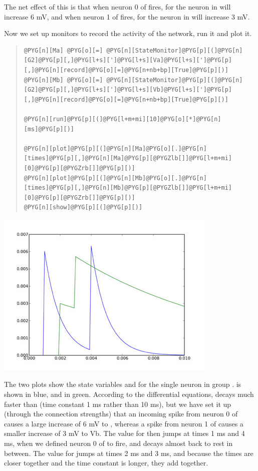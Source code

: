 \documentclass[letterpaper,10pt,english]{manual}
\begin{document}
The net effect of this is that when neuron 0 of  fires,  for
the neuron in  will increase 6 mV, and when neuron 1 of  fires,
 for the neuron in  will increase 3 mV.

Now we set up monitors to record the activity of the network,
run it and plot it.
\begin{quote}

\begin{Verbatim}[commandchars=@\[\]]
@PYG[n][Ma] @PYG[o][=] @PYG[n][StateMonitor]@PYG[p][(]@PYG[n][G2]@PYG[p][,]@PYG[l+s][']@PYG[l+s][Va]@PYG[l+s][']@PYG[p][,]@PYG[n][record]@PYG[o][=]@PYG[n+nb+bp][True]@PYG[p][)]
@PYG[n][Mb] @PYG[o][=] @PYG[n][StateMonitor]@PYG[p][(]@PYG[n][G2]@PYG[p][,]@PYG[l+s][']@PYG[l+s][Vb]@PYG[l+s][']@PYG[p][,]@PYG[n][record]@PYG[o][=]@PYG[n+nb+bp][True]@PYG[p][)]

@PYG[n][run]@PYG[p][(]@PYG[l+m+mi][10]@PYG[o][*]@PYG[n][ms]@PYG[p][)]

@PYG[n][plot]@PYG[p][(]@PYG[n][Ma]@PYG[o][.]@PYG[n][times]@PYG[p][,]@PYG[n][Ma]@PYG[p][@PYGZlb[]]@PYG[l+m+mi][0]@PYG[p][@PYGZrb[]]@PYG[p][)]
@PYG[n][plot]@PYG[p][(]@PYG[n][Mb]@PYG[o][.]@PYG[n][times]@PYG[p][,]@PYG[n][Mb]@PYG[p][@PYGZlb[]]@PYG[l+m+mi][0]@PYG[p][@PYGZrb[]]@PYG[p][)]
@PYG[n][show]@PYG[p][(]@PYG[p][)]
\end{Verbatim}
\end{quote}

\includegraphics{2a.jpg}

The two plots show the state variables  and  for the single
neuron in group .  is shown in blue, and  in green.
According to the differential equations,  decays much faster
than  (time constant 1 ms rather than 10 ms), but we have set
it up (through the connection strengths) that an incoming
spike from neuron 0 of  causes a large increase of 6 mV to ,
whereas a spike from neuron 1 of  causes a smaller increase of
3 mV to Vb. The value for  then jumps at times 1 ms and 4 ms,
when we defined neuron 0 of  to fire, and decays almost back
to rest in between. The value for  jumps at times 2 ms and
3 ms, and because the times are closer together and the time
constant is longer, they add together.
\end{document}
